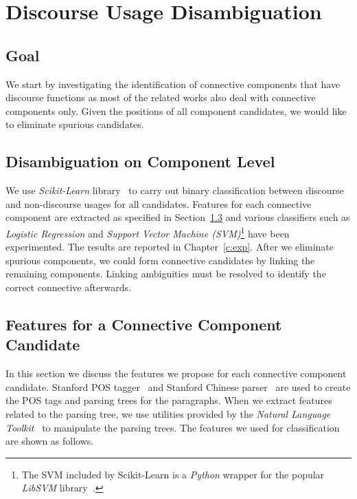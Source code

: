 

\section{Discourse Usage Disambiguation}
\label{s:discourse-disambig}

\subsection{Goal}

We start by investigating the identification of connective components that have discourse functions
as most of the related works also deal with connective components only.
Given the positions of all component candidates, we would like to eliminate spurious candidates.

\subsection{Disambiguation on Component Level}
\label{s:discourse-disambig-component}


We use \textit{Scikit-Learn} library~\citep{scikit-learn} to carry out binary
classification between discourse and non-discourse usages for all candidates.
Features for each connective component are extracted as specified in
Section~\ref{s:comp-features} and various
classifiers such as \textit{Logistic Regression} and
\textit{Support Vector Machine (SVM)}\footnote{The SVM included by Scikit-Learn is
a \textit{Python} wrapper for the popular \textit{LibSVM} library~\citep{CC01a}.}
have been experimented. The results are reported in Chapter~\ref{c:exp}. 
After we eliminate spurious components, we could form connective candidates
by linking the remaining components. Linking ambiguities must be resolved to
identify the correct connective afterwards.


\subsection{Features for a Connective Component Candidate}
\label{s:comp-features}

In this section we discuss the features we propose for each connective
component candidate.
Stanford POS tagger~\citep{toutanova2003feature} and Stanford Chinese
parser~\citep{levy2003harder} are used to create the POS tags and parsing trees
for the paragraphs. When we extract features related to the parsing tree, we use
utilities provided by the \textit{Natural Language Toolkit}~\citep{BirdKleinLoper09}
to manipulate the parsing trees. The features we used for classification
are shown as follows.


